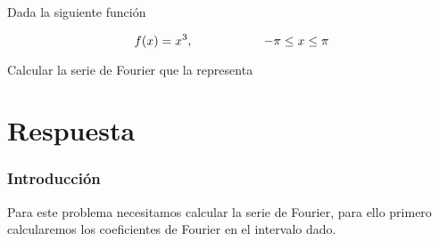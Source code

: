 \item Dada la siguiente función
        \begin{LARGE}
            \begin{equation*}
                f(x) = x^3 , \hspace{2 cm} - \pi \leq x \leq \pi
            \end{equation*}
        \end{LARGE}
    Calcular la serie de Fourier que la representa
\section*{Respuesta}
    \subsubsection*{Introducción}
        Para este problema necesitamos calcular la serie de Fourier, para ello primero calcularemos los coeficientes de Fourier 
        en el intervalo dado.
